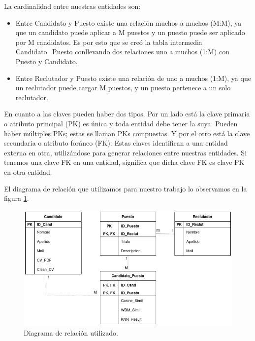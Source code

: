 \documentclass[12pt,a4paper]{article}
\begin{document}
La cardinalidad entre nuestras entidades son:
\begin{itemize}
\item Entre Candidato y Puesto existe una relación muchos a muchos (M:M), ya que un candidato puede aplicar a M puestos y un puesto puede ser aplicado por M candidatos. Es por esto que se creó la tabla intermedia Candidato\_Puesto conllevando dos relaciones uno a muchos (1:M) con Puesto y Candidato.
\item Entre Reclutador y Puesto existe una relación de uno a muchos (1:M), ya que un reclutador puede cargar M puestos, y un puesto pertenece a un solo reclutador.
\end{itemize}

En cuanto a las claves pueden haber dos tipos. Por un lado está la clave primaria o atributo principal (PK)  es única y toda entidad debe tener la suya. Pueden haber múltiples PKs; estas se llaman PKs compuestas. Y por el otro está la clave secundaria o atributo foráneo (FK). Estas claves identifican a una entidad externa en otra, utilizándose para generar relaciones entre nuestras entidades. Si tenemos una clave FK en una entidad, significa que dicha clave FK es clave PK en otra entidad.


El diagrama de relación que utilizamos para nuestro trabajo lo observamos en la figura \ref{fig:Entity_Relation}.

\begin{figure}[H]    %
  \centering
  \includegraphics[width=1\textwidth]{images/BD_Entity_Relation.png}
  \caption{Diagrama de relación utilizado.}  
  \label{fig:Entity_Relation}
\end{figure}

\cleardoublepage
\end{document}
